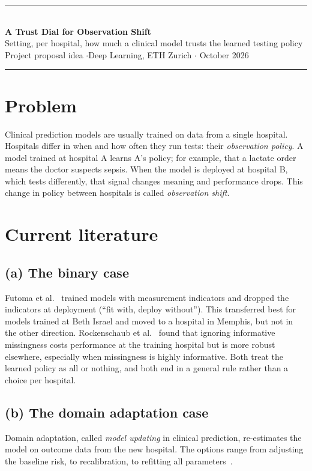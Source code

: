 \documentclass[11pt,a4paper]{article}
\begin{document}
{\color{accent}\rule{\linewidth}{0.8pt}}\\[0.3em]
{\LARGE\bfseries A Trust Dial for Observation Shift}\\[0.35em]
{\large Setting, per hospital, how much a clinical model trusts the learned testing policy}\\[0.6em]
{\color{muted}Project proposal idea \quad$\cdot$\quad Deep Learning, ETH Zurich \quad$\cdot$ October 2026}\\[-0.2em]
{\color{accent}\rule{\linewidth}{0.8pt}}

\section{Problem}

Clinical prediction models are usually trained on data from a single hospital. Hospitals differ in when and how often they run tests: their \emph{observation policy}. A model trained at hospital A learns A's policy; for example, that a lactate order means the doctor suspects sepsis. When the model is deployed at hospital B, which tests differently, that signal changes meaning and performance drops. This change in policy between hospitals is called \emph{observation shift}.

\section{Current literature}

\subsection*{(a) The binary case}
Futoma et al.~\cite{futoma2021} trained models with measurement indicators and dropped the indicators at deployment (``fit with, deploy without''). This transferred best for models trained at Beth Israel and moved to a hospital in Memphis, but not in the other direction. Rockenschaub et al.~\cite{rockenschaub2024} found that ignoring informative missingness costs performance at the training hospital but is more robust elsewhere, especially when missingness is highly informative. Both treat the learned policy as all or nothing, and both end in a general rule rather than a choice per hospital.

\subsection*{(b) The domain adaptation case}
Domain adaptation, called \emph{model updating} in clinical prediction, re-estimates the model on outcome data from the new hospital. The options range from adjusting the baseline risk, to recalibration, to refitting all parameters~\cite{steyerberg2004,vergouwe2017}.
\end{document}
